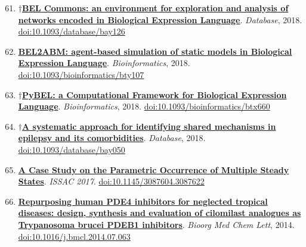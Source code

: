 \documentclass[10pt,a4paper,sans]{moderncv} %
\newcommand{\wikidata}[2]{\href{https://bioregistry.io/wikidata:#1?provider=scholia}{{#2}}}
\begin{document}
    \begin{enumerate}
    \setcounter{enumi}{60}
    \itemsep0.5em
        \item
        $\dagger$\wikidata{Q60302045}{\textbf{BEL Commons: an environment for exploration and analysis of networks encoded in Biological Expression Language}}.
    \textit{Database}, 2018.  {\scriptsize \href{https://bioregistry.io/doi:10.1093/DATABASE/BAY126}{doi:10.1093/database/bay126}}
        \item
        \wikidata{Q51056857}{\textbf{BEL2ABM: agent-based simulation of static models in Biological Expression Language}}.
    \textit{Bioinformatics}, 2018.  {\scriptsize \href{https://bioregistry.io/doi:10.1093/BIOINFORMATICS/BTY107}{doi:10.1093/bioinformatics/bty107}}
        \item
        $\dagger$\wikidata{Q42695788}{\textbf{PyBEL: a Computational Framework for Biological Expression Language}}.
    \textit{Bioinformatics}, 2018.  {\scriptsize \href{https://bioregistry.io/doi:10.1093/BIOINFORMATICS/BTX660}{doi:10.1093/bioinformatics/btx660}}
        \item
        $\dagger$\wikidata{Q55315340}{\textbf{A systematic approach for identifying shared mechanisms in epilepsy and its comorbidities}}.
    \textit{Database}, 2018.  {\scriptsize \href{https://bioregistry.io/doi:10.1093/DATABASE/BAY050}{doi:10.1093/database/bay050}}
    \end{enumerate}
    \begin{enumerate}
    \setcounter{enumi}{64}
    \itemsep0.5em
        \item
        \wikidata{Q47479157}{\textbf{A Case Study on the Parametric Occurrence of Multiple Steady States}}.
    \textit{ISSAC 2017}.  {\scriptsize \href{https://bioregistry.io/doi:10.1145/3087604.3087622}{doi:10.1145/3087604.3087622}}
    \end{enumerate}
    \begin{enumerate}
    \setcounter{enumi}{65}
    \itemsep0.5em
        \item
        \wikidata{Q34138086}{\textbf{Repurposing human PDE4 inhibitors for neglected tropical diseases: design, synthesis and evaluation of cilomilast analogues as Trypanosoma brucei PDEB1 inhibitors}}.
    \textit{Bioorg Med Chem Lett}, 2014.  {\scriptsize \href{https://bioregistry.io/doi:10.1016/J.BMCL.2014.07.063}{doi:10.1016/j.bmcl.2014.07.063}}
    \end{enumerate}
\end{document}
